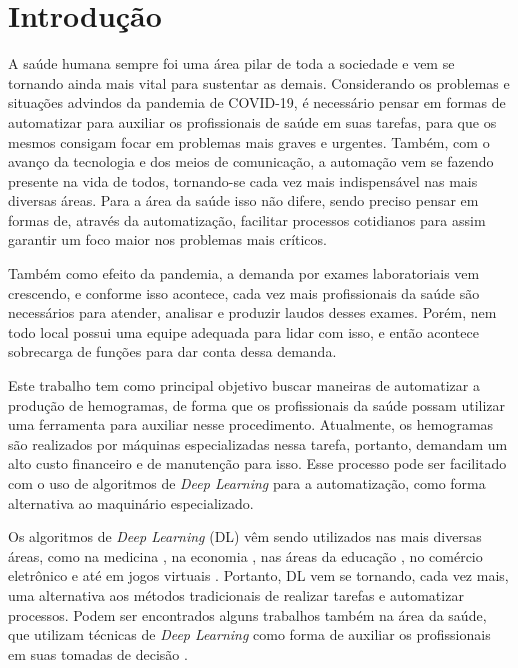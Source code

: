 \chapter{Introdução}
\label{chap:introducao}

A saúde humana sempre foi uma área pilar de toda a sociedade e vem se tornando ainda mais vital para sustentar as demais. Considerando os problemas e situações advindos da pandemia de COVID-19, é necessário pensar em formas de automatizar para auxiliar os profissionais de saúde em suas tarefas, para que os mesmos consigam focar em problemas mais graves e urgentes. Também, com o avanço da tecnologia e dos meios de comunicação, a automação vem se fazendo presente na vida de todos, tornando-se cada vez mais indispensável nas mais diversas áreas. Para a área da saúde isso não difere, sendo preciso pensar em formas de, através da automatização, facilitar processos cotidianos para assim garantir um foco maior nos problemas mais críticos.

Também como efeito da pandemia, a demanda por exames laboratoriais vem crescendo, e conforme isso acontece, cada vez mais profissionais da saúde são necessários para atender, analisar e produzir laudos desses exames. Porém, nem todo local possui uma equipe adequada para lidar com isso, e então acontece sobrecarga de funções para dar conta dessa demanda.

Este trabalho tem como principal objetivo buscar maneiras de automatizar a produção de hemogramas, de forma que os profissionais da saúde possam utilizar uma ferramenta para auxiliar nesse procedimento. Atualmente, os hemogramas são realizados por máquinas especializadas nessa tarefa, portanto, demandam um alto custo financeiro e de manutenção para isso. Esse processo pode ser facilitado com o uso de algoritmos de \emph{Deep Learning} para a automatização, como forma alternativa ao maquinário especializado.

Os algoritmos de \emph{Deep Learning} (DL) vêm sendo utilizados nas mais diversas áreas, como na medicina \cite{deepLearningMedicine}, na economia \cite{deepLearningEconomy}, nas áreas da educação \cite{deepLearningEducation}, no comércio eletrônico \cite{deepLearningEcommerce} e até em jogos virtuais \cite{deepLearningGaming}. Portanto, DL vem se tornando, cada vez mais, uma alternativa aos métodos tradicionais de realizar tarefas e automatizar processos. Podem ser encontrados alguns trabalhos também na área da saúde, que utilizam técnicas de \emph{Deep Learning} como forma de auxiliar os profissionais em suas tomadas de decisão \cite{deepLearningHealth1, deepLearningHealth2}.

